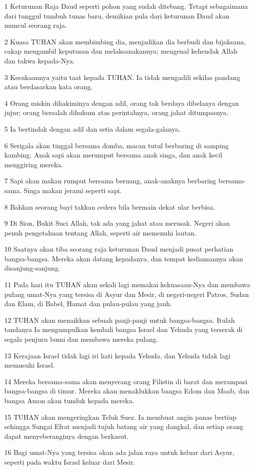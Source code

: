 \par 1 Keturunan Raja Daud seperti pohon yang sudah ditebang. Tetapi sebagaimana dari tunggul tumbuh tunas baru, demikian pula dari keturunan Daud akan muncul seorang raja.
\par 2 Kuasa TUHAN akan membimbing dia, menjadikan dia berbudi dan bijaksana, cakap mengambil keputusan dan melaksanakannya; mengenal kehendak Allah dan takwa kepada-Nya.
\par 3 Kesukaannya yaitu taat kepada TUHAN. Ia tidak mengadili sekilas pandang atau berdasarkan kata orang.
\par 4 Orang miskin dihakiminya dengan adil, orang tak berdaya dibelanya dengan jujur; orang bersalah dihukum atas perintahnya, orang jahat ditumpasnya.
\par 5 Ia bertindak dengan adil dan setia dalam segala-galanya.
\par 6 Serigala akan tinggal bersama domba, macan tutul berbaring di samping kambing. Anak sapi akan merumput bersama anak singa, dan anak kecil menggiring mereka.
\par 7 Sapi akan makan rumput bersama beruang, anak-anaknya berbaring bersama-sama. Singa makan jerami seperti sapi.
\par 8 Bahkan seorang bayi takkan cedera bila bermain dekat ular berbisa.
\par 9 Di Sion, Bukit Suci Allah, tak ada yang jahat atau merusak. Negeri akan penuh pengetahuan tentang Allah, seperti air memenuhi lautan.
\par 10 Saatnya akan tiba seorang raja keturunan Daud menjadi pusat perhatian bangsa-bangsa. Mereka akan datang kepadanya, dan tempat kediamannya akan disanjung-sanjung.
\par 11 Pada hari itu TUHAN akan sekali lagi memakai kekuasaan-Nya dan membawa pulang umat-Nya yang tersisa di Asyur dan Mesir, di negeri-negeri Patros, Sudan dan Elam, di Babel, Hamat dan pulau-pulau yang jauh.
\par 12 TUHAN akan menaikkan sebuah panji-panji untuk bangsa-bangsa. Itulah tandanya Ia mengumpulkan kembali bangsa Israel dan Yehuda yang terserak di segala penjuru bumi dan membawa mereka pulang.
\par 13 Kerajaan Israel tidak lagi iri hati kepada Yehuda, dan Yehuda tidak lagi memusuhi Israel.
\par 14 Mereka bersama-sama akan menyerang orang Filistin di barat dan merampasi bangsa-bangsa di timur. Mereka akan menaklukkan bangsa Edom dan Moab, dan bangsa Amon akan tunduk kepada mereka.
\par 15 TUHAN akan mengeringkan Teluk Suez. Ia membuat angin panas bertiup sehingga Sungai Efrat menjadi tujuh batang air yang dangkal, dan setiap orang dapat menyeberanginya dengan berkasut.
\par 16 Bagi umat-Nya yang tersisa akan ada jalan raya untuk keluar dari Asyur, seperti pada waktu Israel keluar dari Mesir.

